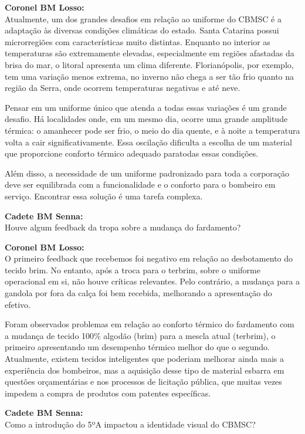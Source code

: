 \noindent \textbf{Coronel BM Losso:} \\ Atualmente, um dos grandes desafios em relação ao uniforme do CBMSC é a adaptação às
diversas condições climáticas do estado. Santa Catarina possui microrregiões com
características muito distintas. Enquanto no interior as temperaturas são extremamente
elevadas, especialmente em regiões afastadas da brisa do mar, o litoral apresenta um clima
diferente. Florianópolis, por exemplo, tem uma variação menos extrema, no inverno não chega
a ser tão frio quanto na região da Serra, onde ocorrem temperaturas negativas e até neve.

\noindent Pensar em um uniforme único que atenda a todas essas variações é um grande desafio. Há
localidades onde, em um mesmo dia, ocorre uma grande amplitude térmica: o amanhecer pode
ser frio, o meio do dia quente, e à noite a temperatura volta a cair significativamente. Essa
oscilação dificulta a escolha de um material que proporcione conforto térmico adequado paratodas essas condições.

\noindent Além disso, a necessidade de um uniforme padronizado para toda a corporação deve ser
equilibrada com a funcionalidade e o conforto para o bombeiro em serviço. Encontrar essa
solução é uma tarefa complexa.

\noindent \textbf{Cadete BM Senna:} \\ Houve algum feedback da tropa sobre a mudança do fardamento?

\noindent \textbf{Coronel BM Losso:} \\ O primeiro feedback que recebemos foi negativo em relação ao desbotamento do tecido brim. No entanto, após a troca para o terbrim, sobre o uniforme operacional em si, não houve críticas relevantes. Pelo contrário, a mudança para a gandola por fora da calça foi bem recebida, melhorando a apresentação do efetivo.

\noindent Foram observados problemas em relação ao conforto térmico do fardamento com a mudança
de tecido 100\% algodão (brim) para a mescla atual (terbrim), o primeiro apresentando um
desempenho térmico melhor do que o segundo. Atualmente, existem tecidos inteligentes que
poderiam melhorar ainda mais a experiência dos bombeiros, mas a aquisição desse tipo de
material esbarra em questões orçamentárias e nos processos de licitação pública, que muitas
vezes impedem a compra de produtos com patentes específicas.

\noindent \textbf{Cadete BM Senna:} \\ Como a introdução do 5ºA impactou a identidade visual do CBMSC?

